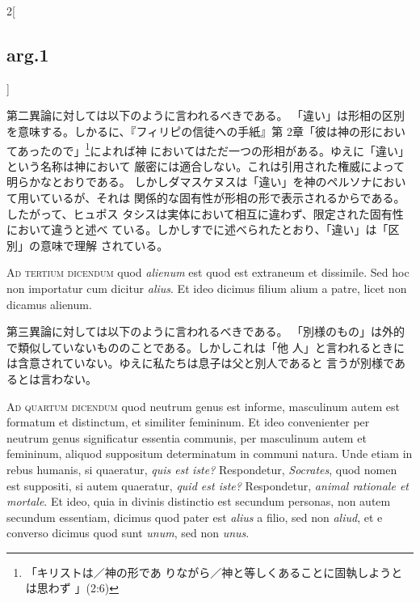 \documentclass[paper=a4paper,fontsize=10pt,jafontsize=9pt,titlepage]{jlreq}
\begin{document}
\begin{paracol}{2}[\subsection{arg.1}]
\switchcolumn

第二異論に対しては以下のように言われるべきである。
「違い」は形相の区別を意味する。しかるに、『フィリピの信徒への手紙』第
 2章「彼は神の形においてあったので」\footnote{「キリストは／神の形であ
 りながら／神と等しくあることに固執しようとは思わず 」(2:6)}によれば神
 においてはただ一つの形相がある。ゆえに「違い」という名称は神において
 厳密には適合しない。これは引用された権威によって明らかなとおりである。
しかしダマスケヌスは「違い」を神のペルソナにおいて用いているが、それは
 関係的な固有性が形相の形で表示されるからである。したがって、ヒュポス
 タシスは実体において相互に違わず、限定された固有性において違うと述べ
 ている。しかしすでに述べられたとおり、「違い」は「区別」の意味で理解
 されている。

\switchcolumn*[\subsection{ad.3}]

{\scshape Ad tertium dicendum} quod {\itshape alienum} est quod est extraneum et
dissimile. Sed hoc non importatur cum dicitur {\itshape alius}. Et ideo dicimus
filium alium a patre, licet non dicamus alienum.

\switchcolumn

第三異論に対しては以下のように言われるべきである。
「別様のもの」は外的で類似していないもののことである。しかしこれは「他
 人」と言われるときには含意されていない。ゆえに私たちは息子は父と別人であると
 言うが別様であるとは言わない。

\switchcolumn*[\subsection{ad.4}]

{\scshape Ad quartum dicendum} quod neutrum genus est informe, masculinum autem
est formatum et distinctum, et similiter femininum. Et ideo
convenienter per neutrum genus significatur essentia communis, per
masculinum autem et femininum, aliquod suppositum determinatum in
communi natura. Unde etiam in rebus humanis, si quaeratur, {\itshape quis est
iste?} Respondetur, {\itshape Socrates}, quod nomen est suppositi, si autem
quaeratur, {\itshape quid est iste?} Respondetur, {\itshape animal rationale et mortale}. Et
ideo, quia in divinis distinctio est secundum personas, non autem
secundum essentiam, dicimus quod pater est {\itshape alius} a filio, sed non
{\itshape aliud}, et e converso dicimus quod sunt {\itshape unum}, sed non {\itshape unus}.


\end{paracol}
\end{document}
